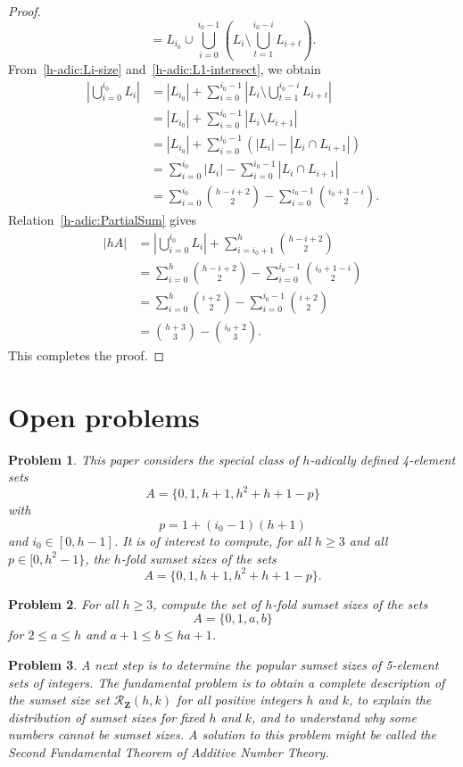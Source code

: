 \documentclass{amsart}
\newtheorem{problem}{Problem}
\newcommand{\bprob}{\begin{problem}}
\newcommand{\eprob}{\end{problem}}
\newcommand{\Z}{\ensuremath{\mathbf Z}}
\newcommand{\mcr}{\ensuremath{ \mathcal R}}
\begin{document}
\begin{proof}
\[ = L_{i_0} \cup  \bigcup_{i=0}^{i_0-1} \left( L_i \setminus \bigcup_{t = 1}^{i_0-i} L_{i+t}  \right).
\]
From~\eqref{h-adic:Li-size} and~\eqref{h-adic:L1-intersect}, we obtain  
\begin{align*}        
\left| \bigcup_{i=0}^{i_0} L_i \right| 
& = | L_{i_0}| + \sum_{i=0}^{i_0-1}  \left|   L_i \setminus \bigcup_{t = 1}^{i_0-i} L_{i+t} \right| \\ 
&  = | L_{i_0}| +  \sum_{i=0}^{i_0-1}  \left| L_i \setminus  L_{i+1}\right|  \\ 
& =  | L_{i_0}| + \sum_{i=0}^{i_0-1} \left(\left| L_i \right|  -  \left| L_i \cap L_{i+1}\right| \right) \\
&  = \sum_{i=0}^{i_0} \left| L_i \right|  
 -  \sum_{i=0}^{i_0 -1}  \left| L_i \cap L_{i+1}\right| \\
& = \sum_{i=0}^{i_0} \binom{h-i+2}{2} - \sum_{i=0}^{i_0-1}  \binom{i_0+1-i}{2}.
\end{align*}
Relation~\eqref{h-adic:PartialSum} gives 
\begin{align*} 
|hA| 
& =  \left|  \bigcup_{i=0}^{i_0} L_i \right| +  \sum_{i=i_0+1}^h  \binom{h-i+2}{2} \\ 
& =   \sum_{i=0}^h  \binom{h-i+2}{2} -  \sum_{i=0}^{i_0 -1}  \binom{i_0+1-i}{2} \\
& =   \sum_{i=0}^h  \binom{ i+2}{2} -  \sum_{i=0}^{i_0-1}  \binom{i+2}{2} \\
& =  \binom{ h+3}{3} - \binom{i_0+2}{3}. 
\end{align*}
This completes the proof. 
 \end{proof}
 
 
 
 
 
\section{Open problems} 
\bprob
This paper considers the special class of $h$-adically defined 4-element sets 
\[
A   = \{0,1,h+1,h^2+h+1-p \}
\]
with 
\[
p = 1 + (i_0-1)(h+1) 
\] 
and $i_0 \in [0,h-1]$.  
It is of interest to compute, for all $h \geq 3$ and all $p\in [0,h^2-1\}$, 
the $h$-fold sumset sizes of the sets  
\[
A = \{0,1,h+1,h^2+h+1-p\}. 
\]
\eprob

\bprob
For all $h \geq 3$, compute the set of $h$-fold sumset sizes of the sets 
\[
A = \{0,1,a,b\}
\]
for $2 \leq a \leq h$ and $a+1 \leq b \leq ha+1$.
\eprob


\bprob 
A next step is to determine the popular sumset sizes of 5-element sets of integers.  
The fundamental problem is to obtain a complete description 
of the sumset size set $\mcr_{\Z}(h,k)$ 
for all positive integers $h$ and $k$, 
to explain the distribution of sumset sizes for fixed $h$ and $k$, 
 and to understand why some numbers cannot be sumset sizes.  
 A solution to this problem might be called the 
\emph{Second Fundamental Theorem of Additive Number Theory}. 
\eprob
\end{document}
